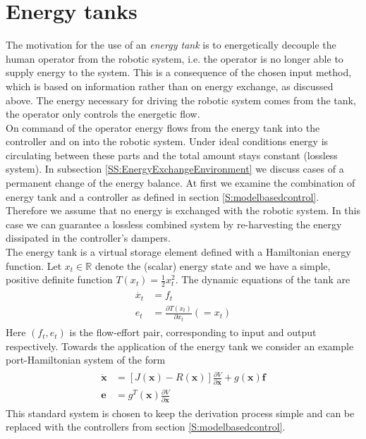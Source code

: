 \documentclass[a4paper,twoside, openright,12pt]{report}
\newcommand{\f}[1]{\boldsymbol{#1}}
\begin{document}
\section{Energy tanks}\label{S:EnergyTanks}
The motivation for the use of an \emph{energy tank} is to energetically decouple the human operator from the robotic system, i.e. the operator is no longer able to supply energy to the system. This is a consequence of the chosen input method, which is based on information rather than on energy exchange, as discussed above. The energy necessary for driving the robotic system comes from the tank, the operator only controls the energetic flow.\\
On command of the operator energy flows from the energy tank into the controller and on into the robotic system. Under ideal conditions energy is circulating between these parts and the total amount stays constant (lossless system). In subsection \ref{SS:EnergyExchangeEnvironment} we discuss cases of a permanent change of the energy balance. At first we examine the combination of energy tank and a controller as defined in section \ref{S:modelbasedcontrol}. Therefore we assume that no energy is exchanged with the robotic system. In this case we can guarantee a lossless combined system by re-harvesting the energy dissipated in the controller's dampers. \\ 
The energy tank is a virtual storage element defined with a Hamiltonian energy function. Let $x_t \in \mathbb{R}$ denote the (scalar) energy state and we have a simple, positive definite function $T(x_t) = \frac{1}{2}x_t^2$. The dynamic equations of the tank are
\begin{eqnarray}
\begin{aligned}
\dot{x_t} &= f_t \\
e_t &= \frac{\partial T(x_t)}{\partial x_t} (=x_t)
\end{aligned}
\end{eqnarray}
Here $(f_t,e_t)$ is the flow-effort pair, corresponding to input and output respectively. Towards the application of the energy tank we consider an example port-Hamiltonian system of the form
\begin{eqnarray}
\begin{aligned}
\dot{\f{x}} &= [J(\f{x}) - R(\f{x})] \frac{\partial V}{\partial \f{x}} + g(\f{x})\f{f} \\
\f{e} &= g^T(\f{x}) \frac{\partial V}{\partial \f{x}}
\end{aligned}
\end{eqnarray}
This standard system is chosen to keep the derivation process simple and can be replaced with the controllers from section \ref{S:modelbasedcontrol}.
\end{document}
